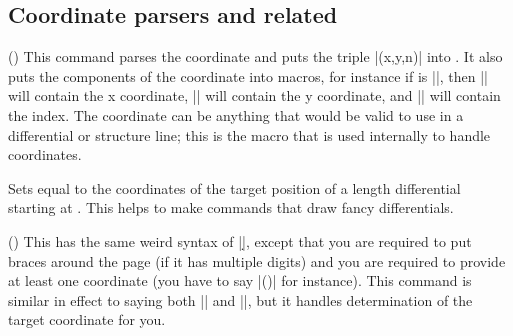 \begin{sseqdata}[name = basic, cohomological Serre grading]
\subsection{Coordinate parsers and related}
\begin{command}{\parsecoordinate{}()}
This command parses the coordinate and puts the triple |(x,y,n)| into . It also puts the components of the coordinate into macros, for instance if  is |\coord|, then |\xcoord| will contain the x coordinate, |\ycoord| will contain the y coordinate, and |\ncoord| will contain the index. The coordinate can be anything that would be valid to use in a differential or structure line; this is the macro that is used internally to handle coordinates.
\end{command}

\begin{command}{\getdtarget{}\pars{\sourcecoord}}
Sets  equal to the coordinates of the target position of a length  differential starting at \sourcecoord. This helps to make commands that draw fancy differentials.
\end{command}

\begin{command}{\parsedifferential{}()}
This has the same weird syntax of |\d|, except that you are required to put braces around the page (if it has multiple digits) and you are required to provide at least one coordinate (you have to say |(\lastclass)| for instance). This command is similar in effect to saying both |\parsecoordinate\source{}| and |\parsecoordinate\target{}|, but it handles determination of the target coordinate for you.



\end{command}
\end{sseqdata}
